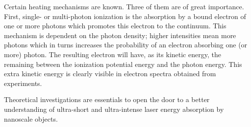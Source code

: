 Certain heating mechanisms are known. Three of them are of great importance.
First, single- or multi-photon ionization is the absorption by a bound electron
of one or more photons which promotes this electron to the continuum. This
mechanism is dependent on the photon density; higher intensities mean more
photons which in turns increases the probability of an electron absorbing one
(or more) photon. The resulting electron will have, as its kinetic energy, the
remaining between the ionization potential energy and the photon energy. This
extra kinetic energy is clearly visible in electron spectra obtained from
experiments.



Theoretical investigations are essentials to open the door to a better 
understanding of ultra-short and ultra-intense laser energy absorption by 
nanoscale objects.


